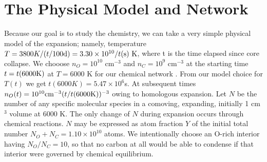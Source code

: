 \documentclass[manuscript]{aastex}
\begin{document}
\section{The Physical Model and Network}

Because our goal is to study the chemistry, we can take a very simple physical
model of the expansion; namely, temperature
$T = 3800 K / (t / 100 {\rm d}) =
3.30 \times 10^{10} / t({\rm s})\ {\rm K}$,
where t is the time elapsed since core collapse.
We chooose $n_O = 10^{10}$ cm$^{-3}$
and $n_C = 10^9$ cm$^{-3}$
at the starting time $t = t(6000 {\rm K})$ 
at $T=6000$ K for our chemical network . From our model choice for $T(t)$ we get
$t(6000K) = 5.47 \times 10^6$s. At
subsequent times $n_O(t) = 10^{10}{\rm cm}^{-3}(t/t(6000 {\rm K}))^{-3}$
owing to homologous expansion.
Let $N$ be the number of any specific molecular species
in a comoving, expanding, initially 1 cm$^3$ volume at 6000 K.
The only change of $N$ during
expansion occurs through chemical reactions. $N$ may be expressed as atom
fraction $Y$ of the initial total number
$N_O + N_C = 1.10 \times 10^{10}$ atoms. We
intentionally choose an O-rich interior having $N_O/N_C = 10$,
so that no carbon at
all would be able to condense if that interior were governed by chemical
equilibrium. 
\end{document}

